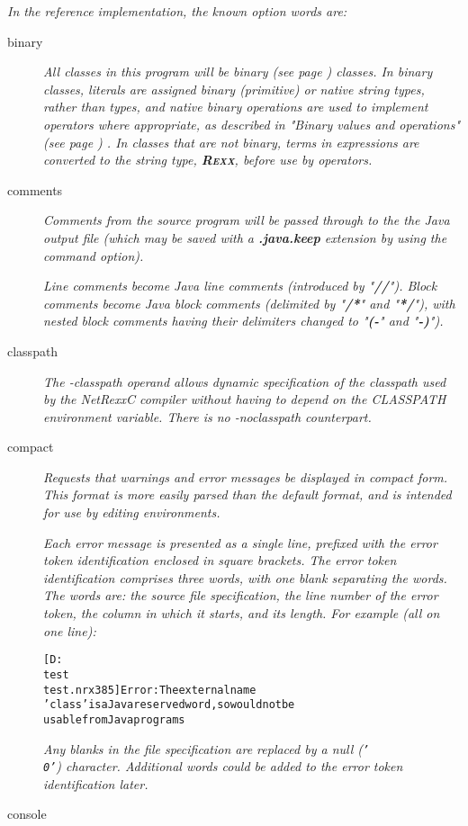 \emph{In the reference implementation, the known option words are:}
\begin{description}
\item[binary]
\emph{All classes in this program will be  binary (see page \pageref{refbincla}) 
classes.
In binary classes, literals are assigned binary (primitive) or native
string types, rather than \nr{} types, and native binary operations
are used to implement operators where appropriate, as described in
 "\emph{Binary values and operations}" (see page \pageref{refbinary}) .
In classes that are not binary, terms in expressions are converted to
the \nr{} string type, \textbf{R\textsc{exx}}, before use by operators.}
\item[comments]

\emph{Comments from the \nr{} source program will be passed through to the
the Java output file (which may be saved with a \textbf{.java.keep}
extension by using the  command option).}
 
\emph{Line comments become Java line comments (introduced by
"\textbf{//}").
Block comments become Java block comments (delimited by
"\textbf{/*}" and "\textbf{*/}"), with nested block
comments having their delimiters changed to "\textbf{(-}" and
"\textbf{-)}").}

\item[classpath]
\emph{The \emph{-classpath} operand allows dynamic specification of the
  classpath used by the NetRexxC compiler without having to depend on
  the CLASSPATH environment variable. There is no -noclasspath counterpart.}

\item[compact]

\emph{Requests that warnings and error messages be displayed in compact
form.  This format is more easily parsed than the default format, and
is intended for use by editing environments.}
 
\emph{Each error message is presented as a single line, prefixed with the
error token identification enclosed in square brackets.
The error token identification comprises three words, with one blank
separating the words.  The words are: the source file specification, the
line number of the error token, the column in which it starts, and its
length.  For example (all on one line):}
\begin{alltt}
[D:\\test\\test.nrx 3 8 5] Error: The external name
'class' is a Java reserved word, so would not be
usable from Java programs
\end{alltt}
\emph{Any blanks in the file specification are replaced by a null
(\texttt{'\\0'}) character.  Additional words could be added to the error
token identification later.}
\item[console]


\end{description}

